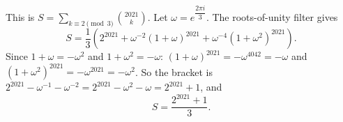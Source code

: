 This is $S=\sum_{k\equiv2\pmod3}\binom{2021}k$. Let $\omega=e^{\dfrac{2\pi i}3}$. The roots-of-unity filter gives
\[S=\dfrac13\left(2^{2021}+\omega^{-2}(1+\omega)^{2021}+\omega^{-4}(1+\omega^2)^{2021}\right).\]
Since $1+\omega=-\omega^2$ and $1+\omega^2=-\omega$: $(1+\omega)^{2021}=-\omega^{4042}=-\omega$ and $(1+\omega^2)^{2021}=-\omega^{2021}=-\omega^2$. So the bracket is $2^{2021}-\omega^{-1}-\omega^{-2}=2^{2021}-\omega^2-\omega=2^{2021}+1$, and
\[S=\boxed{\dfrac{2^{2021}+1}{3}}.\]
